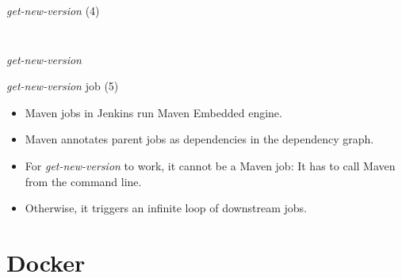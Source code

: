 \documentclass[presentation]{beamer}
\begin{document}
{
\begin{frame}[label=sec-3-9]{\textit{get-new-version} (4)}

\begin{columns}
\begin{column}{0.6\textwidth}
\begin{quotation} %

\end{quotation}
\end{column}
\end{columns}
\end{frame}} %



{
\begin{frame}[label=sec-3-10]{\textit{get-new-version}}

\begin{block}{\textit{get-new-version} job (5)}

\begin{itemize}
\item Maven jobs in Jenkins run Maven Embedded engine.
\item Maven annotates parent jobs as dependencies in the dependency graph.
\item For \textit{get-new-version} to work, it cannot be a Maven job: It has to call Maven from the command line.
\item Otherwise, it triggers an infinite loop of downstream jobs.
\end{itemize}
\end{block}
\end{frame}} %


\section{Docker}
\label{sec-4}
\end{document}
